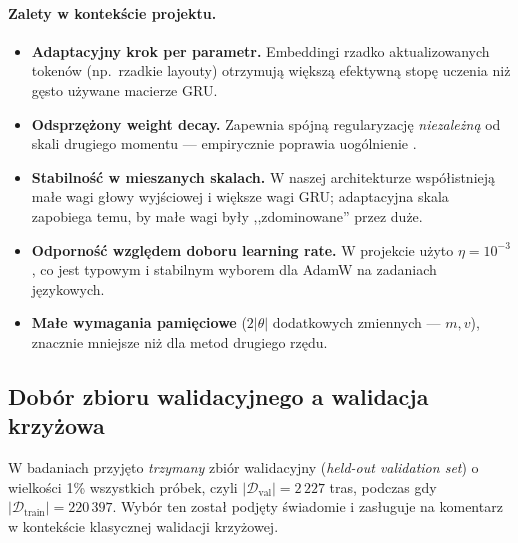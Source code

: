 \documentclass[12pt,a4paper]{article}
\begin{document}
\paragraph{Zalety w kontekście projektu.}
\begin{itemize}[leftmargin=1.5em]
    \item \textbf{Adaptacyjny krok per parametr.} Embeddingi rzadko aktualizowanych tokenów (np.\ rzadkie layouty) otrzymują większą efektywną stopę uczenia niż gęsto używane macierze GRU.
    \item \textbf{Odsprzężony weight decay.} Zapewnia spójną regularyzację \emph{niezależną} od skali drugiego momentu --- empirycznie poprawia uogólnienie \citep{loshchilov2019adamw}.
    \item \textbf{Stabilność w mieszanych skalach.} W naszej architekturze współistnieją małe wagi głowy wyjściowej i większe wagi GRU; adaptacyjna skala zapobiega temu, by małe wagi były ,,zdominowane'' przez duże.
    \item \textbf{Odporność względem doboru learning rate.} W projekcie użyto $\eta = 10^{-3}$, co jest typowym i stabilnym wyborem dla AdamW na zadaniach językowych.
    \item \textbf{Małe wymagania pamięciowe} ($2|\theta|$ dodatkowych zmiennych --- $m, v$), znacznie mniejsze niż dla metod drugiego rzędu.
\end{itemize}

\subsection{Dobór zbioru walidacyjnego a walidacja krzyżowa}
\label{sec:validation}

W badaniach przyjęto \emph{trzymany} zbiór walidacyjny (\textit{held-out validation set}) o wielkości 1\% wszystkich próbek, czyli $|\mathcal{D}_{\text{val}}| = 2\,227$ tras, podczas gdy $|\mathcal{D}_{\text{train}}| = 220\,397$. Wybór ten został podjęty świadomie i zasługuje na komentarz w kontekście klasycznej walidacji krzyżowej.
\end{document}
